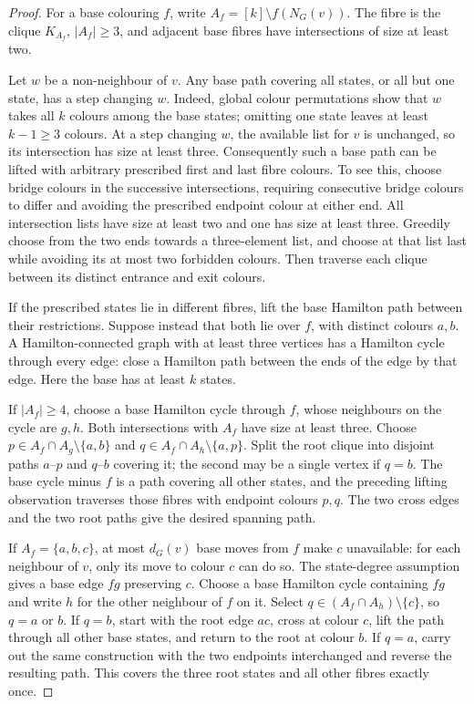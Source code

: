 \documentclass[11pt]{article}
\theoremstyle{remark}
\numberwithin{equation}{section}
\begin{document}
\begin{proof}
For a base colouring $f$, write $A_f=[k]\setminus f(N_G(v))$.
The fibre is the clique $K_{A_f}$, $|A_f|\ge3$, and adjacent base
fibres have intersections of size at least two.

Let $w$ be a non-neighbour of $v$.  Any base path covering all states,
or all but one state, has a step changing $w$.  Indeed, global colour
permutations show that $w$ takes all $k$ colours among the base states;
omitting one state leaves at least $k-1\ge3$ colours.  At a step
changing $w$, the available list for $v$ is unchanged, so its
intersection has size at least three.  Consequently such a base path
can be lifted with arbitrary prescribed first and last fibre colours.
To see this, choose bridge colours in the successive intersections,
requiring consecutive bridge colours to differ and avoiding the
prescribed endpoint colour at either end.  All intersection lists have
size at least two and one has size at least three.  Greedily choose from
the two ends towards a three-element list, and choose at that list last
while avoiding its at most two forbidden colours.  Then traverse each
clique between its distinct entrance and exit colours.

If the prescribed states lie in different fibres, lift the base
Hamilton path between their restrictions.  Suppose instead that both
lie over $f$, with distinct colours $a,b$.  A Hamilton-connected graph
with at least three vertices has a Hamilton cycle through every edge:
close a Hamilton path between the ends of the edge by that edge.
Here the base has at least $k$ states.

If $|A_f|\ge4$, choose a base Hamilton cycle through $f$, whose
neighbours on the cycle are $g,h$.  Both intersections with $A_f$
have size at least three.  Choose
$p\in A_f\cap A_g\setminus\{a,b\}$ and
$q\in A_f\cap A_h\setminus\{a,p\}$.  Split the root clique into
disjoint paths $a$--$p$ and $q$--$b$ covering it; the second may be a
single vertex if $q=b$.  The base cycle minus $f$ is a path covering
all other states, and the preceding lifting observation traverses those
fibres with endpoint colours $p,q$.  The two cross edges and the two
root paths give the desired spanning path.

If $A_f=\{a,b,c\}$, at most $d_G(v)$ base moves from $f$ make $c$
unavailable: for each neighbour of $v$, only its move to colour $c$
can do so.  The state-degree assumption gives a base edge $fg$
preserving $c$.  Choose a base Hamilton cycle containing $fg$ and
write $h$ for the other neighbour of $f$ on it.  Select
$q\in (A_f\cap A_h)\setminus\{c\}$, so $q=a$ or $b$.  If $q=b$,
start with the root edge $a c$, cross at colour $c$, lift the path
through all other base states, and return to the root at colour $b$.
If $q=a$, carry out the same construction with the two endpoints
interchanged and reverse the resulting path.  This covers the three
root states and all other fibres exactly once.
\end{proof}
\end{document}
